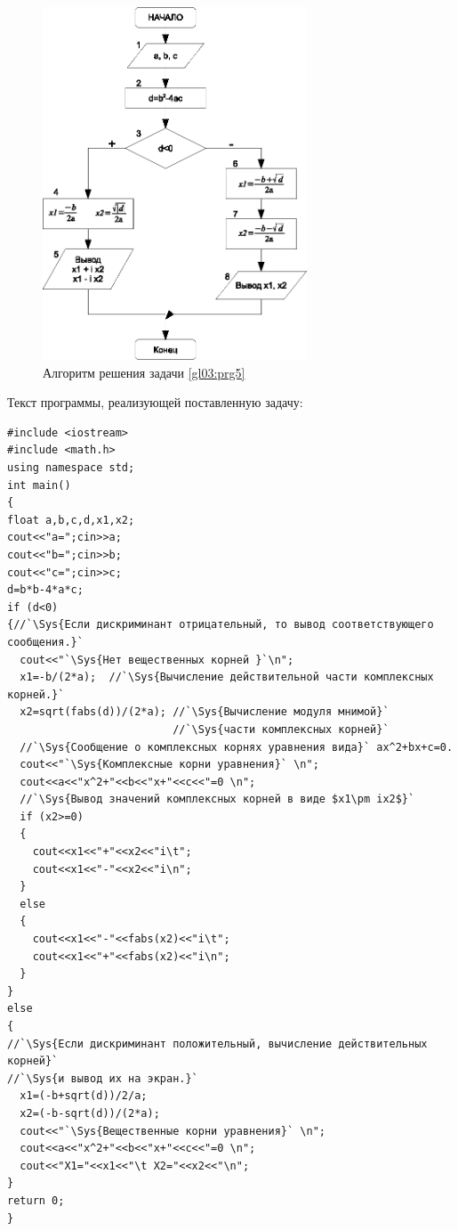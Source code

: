 \begin{figure}[htb]
\begin{center}
\includegraphics[width=0.7\textwidth]{img/ris_3_16}
\caption{Алгоритм решения задачи \ref{gl03:prg5}}
\label{ch03:refDrawing15}
\end{center}
\end{figure}

Текст программы, реализующей поставленную задачу:
\begin{lstlisting}
#include <iostream>
#include <math.h>
using namespace std;
int main()
{
float a,b,c,d,x1,x2;
cout<<"a=";cin>>a;
cout<<"b=";cin>>b;
cout<<"c=";cin>>c;
d=b*b-4*a*c;
if (d<0)
{//`\Sys{Если дискриминант отрицательный, то вывод соответствующего сообщения.}`
  cout<<"`\Sys{Нет вещественных корней }`\n";
  x1=-b/(2*a);  //`\Sys{Вычисление действительной части комплексных корней.}`
  x2=sqrt(fabs(d))/(2*a); //`\Sys{Вычисление модуля мнимой}`
                          //`\Sys{части комплексных корней}`
  //`\Sys{Сообщение о комплексных корнях уравнения вида}` ax^2+bx+c=0.
  cout<<"`\Sys{Комплексные корни уравнения}` \n";
  cout<<a<<"x^2+"<<b<<"x+"<<c<<"=0 \n";
  //`\Sys{Вывод значений комплексных корней в виде $x1\pm ix2$}`
  if (x2>=0)
  {
    cout<<x1<<"+"<<x2<<"i\t";
    cout<<x1<<"-"<<x2<<"i\n";
  }
  else
  {
    cout<<x1<<"-"<<fabs(x2)<<"i\t";
    cout<<x1<<"+"<<fabs(x2)<<"i\n";
  }
}
else
{
//`\Sys{Если дискриминант положительный, вычисление действительных корней}`
//`\Sys{и вывод их на экран.}`
  x1=(-b+sqrt(d))/2/a;
  x2=(-b-sqrt(d))/(2*a);
  cout<<"`\Sys{Вещественные корни уравнения}` \n";
  cout<<a<<"x^2+"<<b<<"x+"<<c<<"=0 \n";
  cout<<"X1="<<x1<<"\t X2="<<x2<<"\n";
}
return 0;
}
\end{lstlisting}

